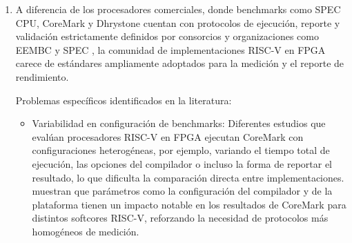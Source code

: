\begin{enumerate}
\begin{itemize}
            \item DSP blocks: Los dispositivos Cyclone V de Intel incorporan bloques DSP de precisión variable que permiten implementar multiplicadores de 18x18, 27x27 y configuraciones derivadas, mientras que las FPGAs Xilinx 7-series integran slices DSP48E1 con un multiplicador típico de 25x18 bits junto con pre-adders y acumuladores de 48 bits. Estas diferencias en la arquitectura interna de los bloques DSP y en su modo de integración con la lógica de la FPGA influyen directamente en cómo se implementa la extensión M de RISC-V, pudiendo favorecer una u otra familia según el tamaño de operandos, el grado de pipeline interno y el estilo de datapath empleado \parencite{intel2018variable,xilinx2014ug479}.

            \item Herramientas de síntesis: Las cadenas de herramientas empleadas utilizan algoritmos de optimización, estrategias de mapeo tecnológico, ubicación y enrutamiento y análisis de temporización estática distintos. Estas variaciones metodológicas en el flujo CAD implican que un mismo código RTL sintetizado para FPGAs equivalentes en capacidad lógica puede generar frecuencias máximas y reportes de utilización de recursos que no son directamente comparables, añadiendo una capa de incertidumbre al comparar resultados de diferentes plataformas \parencite{murray2020vtr8,Heinz2019Catalog}.

            \end{itemize}

            \item A diferencia de los procesadores comerciales, donde benchmarks como SPEC CPU, CoreMark y Dhrystone cuentan con protocolos de ejecución, reporte y validación estrictamente definidos por consorcios y organizaciones como EEMBC y SPEC \parencite{EEMBC2009CoreMark}, la comunidad de implementaciones RISC-V en FPGA carece de estándares ampliamente adoptados para la medición y el reporte de rendimiento.

                Problemas específicos identificados en la literatura:

                \begin{itemize}
                    \item Variabilidad en configuración de benchmarks: Diferentes estudios que evalúan procesadores RISC-V en FPGA ejecutan CoreMark con configuraciones heterogéneas, por ejemplo, variando el tiempo total de ejecución, las opciones del compilador o incluso la forma de reportar el resultado, lo que dificulta la comparación directa entre implementaciones. \textcite{Heinz2019Catalog} muestran que parámetros como la configuración del compilador y de la plataforma tienen un impacto notable en los resultados de CoreMark para distintos softcores RISC-V, reforzando la necesidad de protocolos más homogéneos de medición.


\end{itemize}
\end{enumerate}

